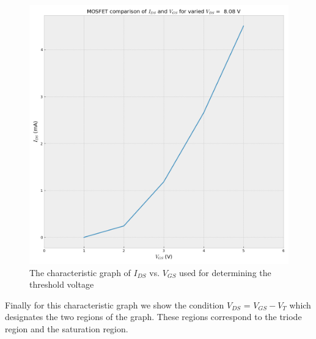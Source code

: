 \begin{figure}[ht]
    \centering
    \includegraphics[width=.95\linewidth]{figures/characteristic_threshold.png}
    \caption{The characteristic graph of $I_{DS}$ vs. $V_{GS}$ used for determining the threshold voltage}
    \label{fig:characteristic_threshold}
\end{figure}

\clearpage

Finally for this characteristic graph we show the condition $V_{DS}$ = $V_{GS} - V_T$ which designates the two regions of the graph. These regions correspond to the triode region and the saturation region.


